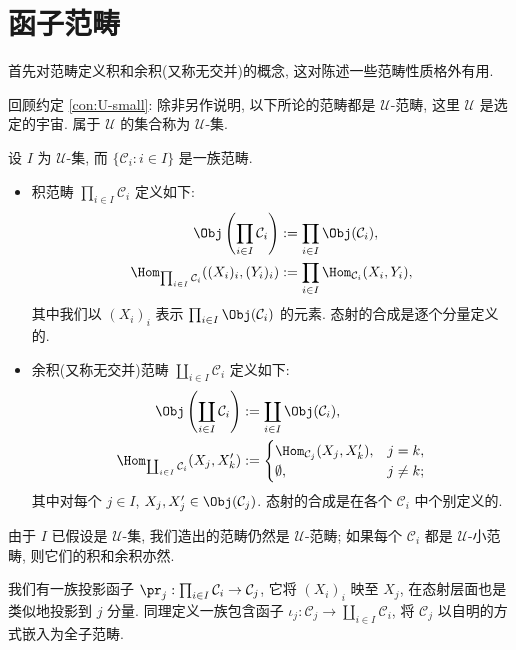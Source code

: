 \section{函子范畴}\label{sec:functor-category}
首先对范畴定义积和余积(又称无交并)的概念, 这对陈述一些范畴性质格外有用.

回顾约定 \ref{con:U-small}: 除非另作说明, 以下所论的范畴都是 $\mathcal{U}$-范畴, 这里 $\mathcal{U}$ 是选定的宇宙. 属于 $\mathcal{U}$ 的集合称为 $\mathcal{U}$-集.

\begin{definition}
	设 $I$ 为 $\mathcal{U}$-集, 而 $\{\mathcal{C}_i : i \in I \}$ 是一族范畴.
	\begin{itemize}
		\item 积范畴 $\prod_{i \in I} \mathcal{C}_i$ 定义如下:
			\begin{align*}
				\Obj\left( \prod_{i \in I} \mathcal{C}_i \right) & := \prod_{i \in I} \Obj(\mathcal{C}_i), \\
				\Hom_{\prod_{i \in I} \mathcal{C}_i}( (X_i)_i, (Y_i)_i ) & := \prod_{i \in I} \Hom_{\mathcal{C}_i}(X_i, Y_i),
			\end{align*}
			其中我们以 $(X_i)_i$ 表示 $\prod_{i \in I} \Obj(\mathcal{C}_i)$ 的元素. 态射的合成是逐个分量定义的.
		\item 余积(又称无交并)范畴 $\coprod_{i \in I} \mathcal{C}_i$ 定义如下:
			\begin{align*}
				\Obj\left( \coprod_{i \in I} \mathcal{C}_i \right) & := \coprod_{i \in I} \Obj(\mathcal{C}_i), \\
				\Hom_{\coprod_{i \in I} \mathcal{C}_i}(X_j, X'_k) & :=
				\begin{cases}
					\Hom_{\mathcal{C}_j}(X_j, X'_k), & j = k, \\
					\emptyset, & j \neq k;
				\end{cases}
			\end{align*}
			其中对每个 $j \in I$, $X_j, X'_j \in \Obj(\mathcal{C}_j)$. 态射的合成是在各个 $\mathcal{C}_i$ 中个别定义的.
	\end{itemize}
\end{definition}
由于 $I$ 已假设是 $\mathcal{U}$-集, 我们造出的范畴仍然是 $\mathcal{U}$-范畴; 如果每个 $\mathcal{C}_i$ 都是 $\mathcal{U}$-小范畴, 则它们的积和余积亦然.

我们有一族投影函子 $\pr_j: \prod_{i \in I} \mathcal{C}_i \to \mathcal{C}_j$, 它将 $(X_i)_i$ 映至 $X_j$, 在态射层面也是类似地投影到 $j$ 分量. 同理定义一族包含函子 $\iota_j: \mathcal{C}_j \to \coprod_{i \in I} \mathcal{C}_i$, 将 $\mathcal{C}_j$ 以自明的方式嵌入为全子范畴.


